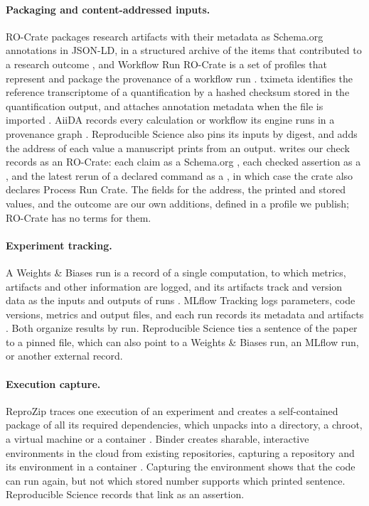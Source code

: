 \paragraph{Packaging and content-addressed inputs.} RO-Crate packages research artifacts with their
metadata as Schema.org annotations in JSON-LD, in a structured archive of the items that
contributed to a research outcome \citep{soilandreyes2022rocrate}, and Workflow Run RO-Crate is a
set of profiles that represent and package the provenance of a workflow run
\citep{leone2024wrroc}. tximeta identifies the reference transcriptome of a
quantification by a hashed checksum stored in the quantification output, and attaches annotation
metadata when the file is imported \citep{love2020tximeta}. AiiDA records every calculation or
workflow its engine runs in a provenance graph \citep{huber2020aiida}. Reproducible Science also pins its inputs
by digest, and adds the address of each value a manuscript prints from an output.  writes our check records as an
RO-Crate: each claim as a Schema.org , each checked assertion as a ,
and the latest rerun of a declared command as a , in which case the crate also
declares Process Run Crate. The fields for the address, the printed and stored values, and the
outcome are our own additions, defined in a profile we publish; RO-Crate has no terms for them.

\paragraph{Experiment tracking.} A Weights \& Biases run is a record of a single computation, to
which metrics, artifacts and other information are logged, and its artifacts track and version
data as the inputs and outputs of runs \citep{wandb2026docs}. MLflow Tracking logs parameters, code
versions, metrics and output files, and each run records its metadata and artifacts
\citep{mlflow2026tracking}. Both organize results by run. Reproducible Science ties a sentence of the
paper to a pinned file, which can also point to a Weights \& Biases run, an MLflow run, or another
external record.

\paragraph{Execution capture.} ReproZip traces one execution of an experiment and creates a
self-contained package of all its required dependencies, which unpacks into a directory, a chroot,
a virtual machine or a container \citep{chirigati2016reprozip}. Binder creates sharable,
interactive environments in the cloud from existing repositories, capturing a repository and its
environment in a container \citep{jupyter2018binder}. Capturing the environment shows that the
code can run again, but not which stored number supports which printed sentence. Reproducible Science records
that link as an assertion.

